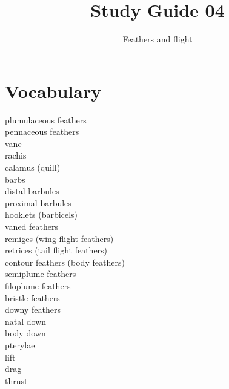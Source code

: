 \documentclass[nofonts, letterpaper]{tufte-handout}
\title{Study Guide 04}
\author{Feathers and flight}
\date{} %
\begin{document}
\maketitle	%


\section{Vocabulary}
\vspace{-1\baselineskip}
\begin{multicols}{2}
\noindent plumulaceous feathers \\
pennaceous feathers \\
vane \\
rachis \\
calamus (quill) \\
barbs  \\
distal barbules \\
proximal barbules \\
hooklets (barbicels) \\
vaned feathers \\
remiges (wing flight feathers) \\
retrices (tail flight feathers) \\
contour feathers (body feathers) \\
semiplume feathers\\
filoplume feathers\\
bristle feathers \\
downy feathers \\
natal down \\
body down \\
pterylae \\
lift \\
drag \\
thrust \\

\end{multicols}
\end{document}
